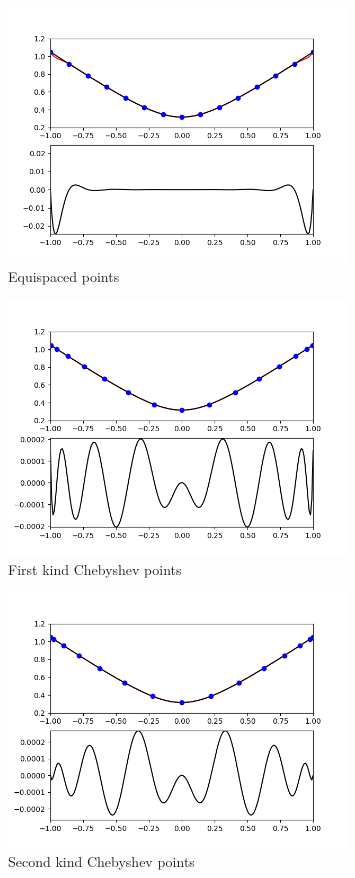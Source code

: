 \documentclass[12pt]{article}
\begin{document}
	\begin{figure}[H]
		\caption{Equispaced points}
		\includegraphics[width=0.80\textwidth]{hw4_figure_1}
		\centering
	\end{figure}
	\begin{figure}[H]
		\caption{First kind Chebyshev points}
		\includegraphics[width=0.80\textwidth]{hw4_figure_2}
		\centering
	\end{figure}
	\begin{figure}[H]
		\caption{Second kind Chebyshev points}
		\includegraphics[width=0.80\textwidth]{hw4_figure_3}
		\centering
	\end{figure}
\end{document}
